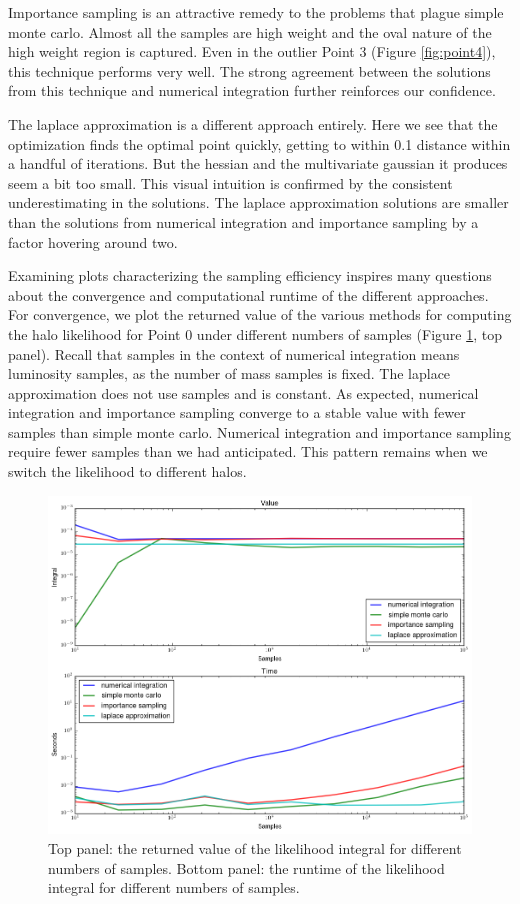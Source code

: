 \documentclass[\docopts]{\docclass}
\begin{document}
Importance sampling is an attractive remedy to the problems that plague simple monte carlo.
Almost all the samples are high weight and the oval nature of the high weight region is captured.
Even in the outlier Point 3 (Figure \ref{fig:point4}), this technique performs very well.
The strong agreement between the solutions from this technique and numerical integration further reinforces our confidence.

The laplace approximation is a different approach entirely.
Here we see that the optimization finds the optimal point quickly, getting to within 0.1 distance within a handful of iterations.
But the hessian and the multivariate gaussian it produces seem a bit too small.
This visual intuition is confirmed by the consistent underestimating in the solutions.
The laplace approximation solutions are smaller than the solutions from numerical integration and importance sampling by a factor hovering around two.

Examining plots characterizing the sampling efficiency inspires many questions about the convergence and computational runtime of the different approaches. 
For convergence, we plot the returned value of the various methods for computing the halo likelihood for Point 0 under different numbers of samples (Figure \ref{fig:convergence}, top panel). 
Recall that samples in the context of numerical integration means luminosity samples, as the number of mass samples is fixed.
The laplace approximation does not use samples and is constant.
As expected, numerical integration and importance sampling converge to a stable value with fewer samples than simple monte carlo. 
Numerical integration and importance sampling require fewer samples than we had anticipated.
This pattern remains when we switch the likelihood to different halos. 

\begin{figure}[!h]
\centering
\includegraphics[width=0.9\columnwidth]{convergence.png}
\caption{
Top panel: the returned value of the likelihood integral for different numbers of samples.
Bottom panel: the runtime of the likelihood integral for different numbers of samples.
\label{fig:convergence}}
\end{figure}
\end{document}
